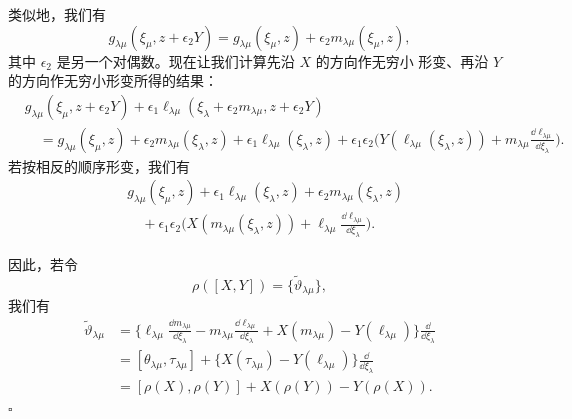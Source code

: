 类似地，我们有
\[
g_{\lambda\mu}(\xi_\mu,z+\epsilon_2Y)
=g_{\lambda\mu}(\xi_\mu,z)+\epsilon_2m_{\lambda\mu}(\xi_\mu,z),
\]
其中 $\epsilon_2$ 是另一个对偶数。现在让我们计算先沿 $X$ 的方向作无穷小
形变、再沿 $Y$ 的方向作无穷小形变所得的结果：
\begin{align*}
&g_{\lambda\mu}(\xi_\mu,z+\epsilon_2Y)
+\epsilon_1\ell_{\lambda\mu}(\xi_\lambda+\epsilon_2m_{\lambda\mu},
z+\epsilon_2Y)\\
&\quad=g_{\lambda\mu}(\xi_\mu,z)+\epsilon_2m_{\lambda\mu}(\xi_\lambda,z)
+\epsilon_1\ell_{\lambda\mu}(\xi_\lambda,z)
+\epsilon_1\epsilon_2\Big(Y(\ell_{\lambda\mu}(\xi_\lambda,z))
+m_{\lambda\mu}\frac{\dd\ell_{\lambda\mu}}{\dd\xi_\lambda}\Big).
\end{align*}
若按相反的顺序形变，我们有
\begin{align*}
&g_{\lambda\mu}(\xi_\mu,z)+\epsilon_1\ell_{\lambda\mu}(\xi_\lambda,z)
+\epsilon_2m_{\lambda\mu}(\xi_\lambda,z)\\
&\quad+\epsilon_1\epsilon_2\Big(X(m_{\lambda\mu}(\xi_\lambda,z))
+\ell_{\lambda\mu}\frac{\dd\ell_{\lambda\mu}}{\dd\xi_\lambda}\Big).
\end{align*}

因此，若令
\[
\rho([X,Y])=\{\tilde{\vartheta}_{\lambda\mu}\},
\]
我们有
\begin{align*}
\tilde{\vartheta}_{\lambda\mu}
&=\Big\{\ell_{\lambda\mu}\frac{\dd m_{\lambda\mu}}{\dd\xi_\lambda}
-m_{\lambda\mu}\frac{\dd\ell_{\lambda\mu}}{\dd\xi_\lambda}
+X(m_{\lambda\mu})-Y(\ell_{\lambda\mu})\Big\}
\frac{\dd}{\dd\xi_\lambda}\\
&=[\theta_{\lambda\mu},\tau_{\lambda\mu}]
+\big\{X(\tau_{\lambda\mu})-Y(\ell_{\lambda\mu})\big\}
\frac{\dd}{\dd\xi_\lambda}\\
&=[\rho(X),\rho(Y)]+X(\rho(Y))-Y(\rho(X)).
\end{align*}
\hfill$\square$
